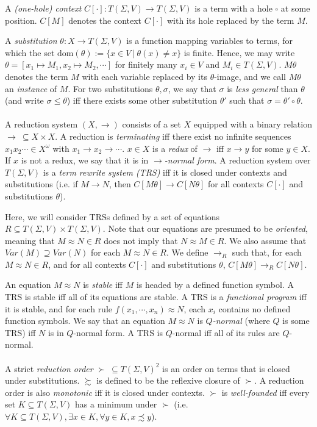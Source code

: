 \documentclass{article}
\theoremstyle{definition}
\begin{document}
A \emph{(one-hole) context} $C[\cdot] : T(\Sigma, V) \rightarrow T(\Sigma, V)$ is a term with a hole $\square$ at some position. $C[M]$ denotes the context $C[\cdot]$ with its hole replaced by the term $M$. 

A \emph{substitution} $\theta : X \rightarrow T(\Sigma, V)$ is a function mapping variables to terms, for which the set $\text{dom}(\theta) := \{ x \in V ~|~ \theta(x) \neq x\}$ is finite. Hence, we may write $\theta = [x_1 \mapsto M_1, x_2 \mapsto M_2, \cdots]$ for finitely many $x_i \in V$ and $M_i \in T(\Sigma,V)$. $M \theta$ denotes the term $M$ with each variable replaced by its $\theta$-image, and we call $M\theta$ an \emph{instance} of $M$. For two substitutions $\theta, \sigma$, we say that $\sigma$ is \emph{less general} than $\theta$ (and write $\sigma \leq \theta$) iff there exists some other substitution $\theta'$ such that $\sigma = \theta' \circ \theta$.
\\~\\
A reduction system $(X, \rightarrow)$ consists of a set $X$ equipped with a binary relation $\rightarrow ~\subseteq X \times X$. A reduction is \emph{terminating} iff there exist no infinite sequences $x_1x_2 \cdots \in X^\omega$ with $x_1 \rightarrow x_2 \rightarrow \cdots$. $x \in X$ is a \emph{redux} of $\rightarrow$ iff $x \rightarrow y$ for some $y \in X$. If $x$ is not a redux, we say that it is in \emph{$\rightarrow$-normal form}. A reduction system over $T(\Sigma, V)$ is a \emph{term rewrite system (TRS)} iff it is closed under contexts and substitutions (i.e. if $M \rightarrow N$, then $C[M\theta] \rightarrow C[N\theta]$ for all contexts $C[\cdot]$ and substitutions $\theta$). 

Here, we will consider TRSs defined by a set of equations $R \subseteq T(\Sigma, V) \times T(\Sigma, V)$. Note that our equations are presumed to be \emph{oriented}, meaning that $M \approx N \in R$ does not imply that $N \approx M \in R$. We also assume that $Var(M) \supseteq Var(N)$ for each $M \approx N \in R$. We define $\rightarrow_R$ such that, for each $M \approx N \in R$, and for all contexts $C[\cdot]$ and substitutions $\theta$, $C[M\theta] \rightarrow_R C[N\theta]$. 

An equation $M \approx N$ is \emph{stable} iff $M$ is headed by a defined function symbol. A TRS is stable iff all of its equations are stable. A TRS is a \emph{functional program} iff it is stable, and for each rule $f(x_1, \cdots, x_n) \approx N$, each $x_i$ contains no defined function symbols. We say that an equation $M \approx N$ is \emph{$Q$-normal} (where $Q$ is some TRS) iff $N$ is in $Q$-normal form. A TRS is $Q$-normal iff all of its rules are $Q$-normal.  
\\~\\
A strict \emph{reduction order} $\succ ~ \subseteq T(\Sigma, V)^2$ is an order on terms that is closed under substitutions.  $\succsim$ is defined to be the reflexive closure of $\succ$. A reduction order is also \emph{monotonic} iff it is closed under contexts. $\succ$ is \emph{well-founded} iff every set $K \subseteq T(\Sigma, V)$ has a minimum under $\succ$ (i.e. $\forall K \subseteq T(\Sigma, V), \exists x \in K, \forall y \in K, x \precsim y$). 
\end{document}
